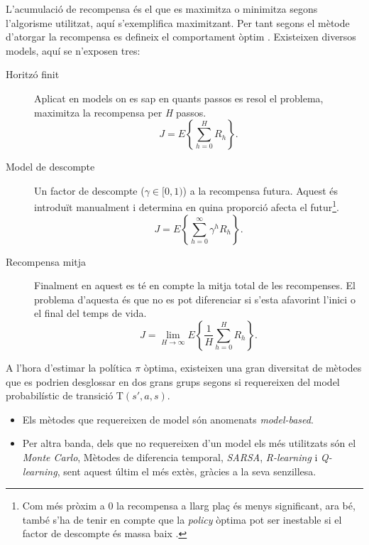 \documentclass[12pt,a4paper,final,twoside]{article}
\begin{document}

L'acumulació de recompensa és el que es maximitza o minimitza segons l'algorisme utilitzat, aquí s'exemplifica maximitzant. Per tant segons el mètode d'atorgar la recompensa es defineix el comportament òptim \cite{Kober2009}. Existeixen diversos models, aquí se n'exposen tres:
\begin{description}


\item[Horitzó finit] Aplicat en models on es sap en quants passos es resol el problema, maximitza la recompensa per \textit{H} passos.
\begin{equation}
J=E\left\{ \sum_{h=0}^{H} R_{h} \right\}.
\end{equation}

\item[Model de descompte] Un factor de descompte ($\gamma\in[0,1)$) a la recompensa futura. Aquest és introduït manualment i determina en quina proporció afecta el futur\footnote{Com més pròxim a 0 la recompensa a llarg plaç és menys significant, ara bé, també s'ha de tenir en compte que la \textit{policy} òptima pot ser inestable si el factor de descompte és massa baix \cite{Kober2009}.}.
\begin{equation}
J=E\left\{ \sum_{h=0}^{\infty} \gamma^h R_{h} \right\}.
\end{equation}

\item[Recompensa mitja] Finalment en aquest es té en compte la mitja total de les recompenses. El problema d'aquesta és que no es pot diferenciar si s'esta afavorint l'inici o el final del temps de vida.
\begin{equation}
J=\lim_{H \to \infty} E\left\{ \frac{1}{H}\sum_{h=0}^{H} R_{h} \right\}.
\end{equation} 

\end{description}

A l'hora d'estimar la política $\pi$ òptima, existeixen una gran diversitat de mètodes que es podrien desglossar en dos grans grups segons si requereixen del model probabilístic de transició T$(s',a,s)$.

\begin{itemize}

\item Els mètodes que requereixen de model són anomenats \textit{model-based}.

\item Per altra banda, dels que no requereixen d'un model els més utilitzats són el \textit{Monte Carlo}, Mètodes de diferencia temporal, \textit{SARSA}, \textit{R-learning} i \textit{Q-learning}, sent aquest últim el més extès, gràcies a la seva senzillesa.

\end{itemize}
\end{document}
